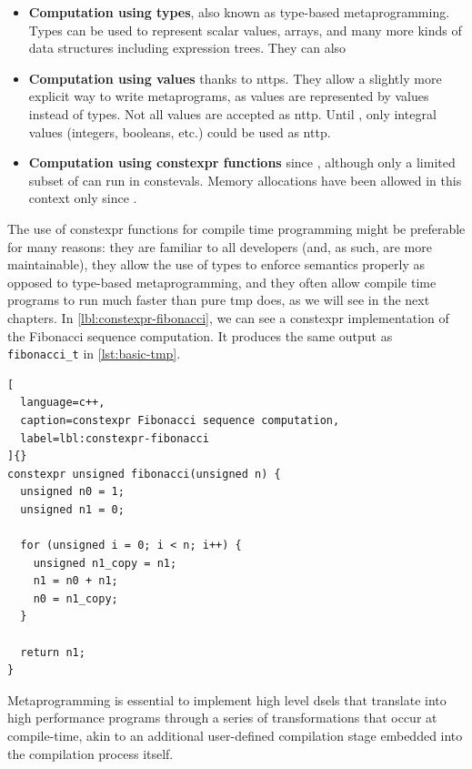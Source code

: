 \documentclass[../main]{subfiles}
\begin{document}
\begin{itemize}

  \item

\textbf{Computation using types}, also known as type-based metaprogramming.
Types can be used to represent scalar values, arrays, and many more
kinds of data structures including expression trees. They can also

  \item

\textbf{Computation using values} thanks to \glspl{nttp}.
They allow a slightly more explicit way to write metaprograms,
as values are represented by values instead of types.
Not all values are accepted as \gls{nttp}.
Until , only integral values (\ie integers, booleans, etc.)
could be used as \gls{nttp}.

  \item

\textbf{Computation using \gls{constexpr} functions} since ,
although only a limited subset of \cpp can run in \glspl{consteval}.
Memory allocations have been allowed in this context only since .

\end{itemize}

The use of \gls{constexpr} functions for compile time programming might be
preferable for many reasons: they are familiar to all \cpp developers
(and, as such, are more maintainable), they allow the use of types to enforce
semantics properly as opposed to type-based metaprogramming, and they often
allow compile time programs to run much faster than pure \gls{tmp} does,
as we will see in the next chapters. In \ref{lbl:constexpr-fibonacci},
we can see a \gls{constexpr} implementation of the Fibonacci sequence
computation. It produces the same output as \lstinline{fibonacci_t} in
\ref{lst:basic-tmp}.

\begin{lstlisting}[
  language=c++,
  caption=constexpr Fibonacci sequence computation,
  label=lbl:constexpr-fibonacci
]{}
constexpr unsigned fibonacci(unsigned n) {
  unsigned n0 = 1;
  unsigned n1 = 0;

  for (unsigned i = 0; i < n; i++) {
    unsigned n1_copy = n1;
    n1 = n0 + n1;
    n0 = n1_copy;
  }

  return n1;
}
\end{lstlisting}

Metaprogramming is essential to implement high level \glspl{dsel} that translate
into high performance programs through a series of transformations that
occur at compile-time, akin to an additional user-defined compilation stage
embedded into the compilation process itself.
\end{document}
